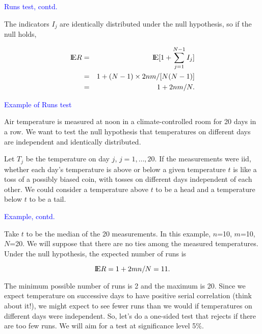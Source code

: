 \documentclass[landscape]{slides}
\newcommand{\EE}{\hbox{I\kern-.1667em\hbox{E}}}
\newcommand{\beq}{\begin{equation}}
\newcommand{\eeq}{\end{equation}}
\begin{document}
\begin{slide}
{\textcolor{blue}{Runs test, contd.}}

The indicators ${I_j}$ are identically distributed under the null hypothesis,
    so if the null holds,

\begin{eqnarray}
    \EE R & = & \EE [ 1 + \sum_{j=1}^{N-1} I_j]  \nonumber \\
              &  = &  1 + (N-1) \times 2nm/[N(N-1)] \nonumber \\
              & = & 1 + 2nm/N.
\end{eqnarray}

\end{slide}

\begin{slide}
{\textcolor{blue}{Example of Runs test}}

 Air temperature is measured at noon in a climate-controlled room for 20
    days in a row.
    We want to test the null hypothesis that temperatures on different
    days are independent and identically distributed.

    Let $T_j$ be the temperature on day $j$,
    $j = 1, \ldots, 20$.
    If the measurements were iid, whether each day's temperature is
    above or below a given temperature $t$ is like a toss of
    a possibly biased coin, with tosses on
    different days independent of each other.
    We could consider a temperature above $t$ to be a head and
    a temperature below $t$ to be a tail.

\end{slide}

\begin{slide}
{\textcolor{blue}{Example, contd.}}

    Take $t$ to be the median of the 20 measurements.
    In this example, $n$=10, $m$=10, $N$=20.
    We will suppose that there are no ties among the measured temperatures.
    Under the null hypothesis, the expected number of runs is

\beq
     \EE R = 1+2mn/N = 11.
\eeq

    The minimum possible number of runs is 2 and the maximum is 20.
    Since we expect temperature on successive days to have positive serial
    correlation (think about it!), we might expect to see fewer runs than
    we would if temperatures on different days were independent.
    So, let's do a one-sided test that rejects if there are too few runs.
    We will aim for a test at significance level 5\%.

\end{slide}
\end{document}
